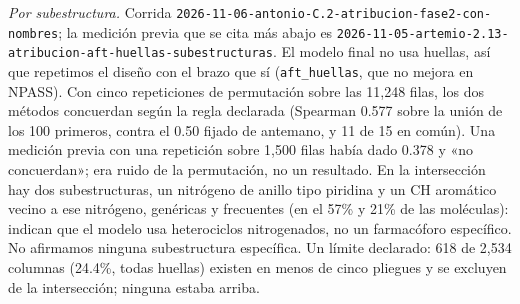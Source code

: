 \documentclass[letterpaper,11pt]{article}
\begin{document}
\emph{Por subestructura.} Corrida \texttt{2026-\allowbreak{}11-\allowbreak{}06-\allowbreak{}antonio-\allowbreak{}C.2-\allowbreak{}atribucion-\allowbreak{}fase2-\allowbreak{}con-\allowbreak{}nombres}; la medición previa que se cita más abajo es \texttt{2026-\allowbreak{}11-\allowbreak{}05-\allowbreak{}artemio-\allowbreak{}2.13-\allowbreak{}atribucion-\allowbreak{}aft-\allowbreak{}huellas-\allowbreak{}subestructuras}. El modelo final no usa huellas, así que repetimos el diseño con el brazo que sí (\texttt{aft\_huellas}, que no mejora en NPASS). Con cinco repeticiones de permutación sobre las 11,248 filas, los dos métodos concuerdan según la regla declarada (Spearman 0.577 sobre la unión de los 100 primeros, contra el 0.50 fijado de antemano, y 11 de 15 en común). Una medición previa con una repetición sobre 1,500 filas había dado 0.378 y «no concuerdan»; era ruido de la permutación, no un resultado. En la intersección hay dos subestructuras, un nitrógeno de anillo tipo piridina y un CH aromático vecino a ese nitrógeno, genéricas y frecuentes (en el 57\% y 21\% de las moléculas): indican que el modelo usa heterociclos nitrogenados, no un farmacóforo específico. No afirmamos ninguna subestructura específica. Un límite declarado: 618 de 2,534 columnas (24.4\%, todas huellas) existen en menos de cinco pliegues y se excluyen de la intersección; ninguna estaba arriba.
\end{document}
